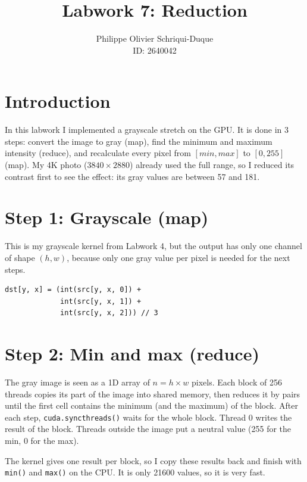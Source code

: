 \documentclass{report}
\begin{document}
\title{Labwork 7: Reduction}
\author{Philippe Olivier Schriqui-Duque \\ ID: 2640042}
\date{}
\maketitle

\section*{Introduction}

In this labwork I implemented a grayscale stretch on the GPU. It is done in 3 steps: convert the image to gray (map), find the minimum and maximum intensity (reduce), and recalculate every pixel from $[min, max]$ to $[0, 255]$ (map). My 4K photo ($3840 \times 2880$) already used the full range, so I reduced its contrast first to see the effect: its gray values are between 57 and 181.

\section*{Step 1: Grayscale (map)}

This is my grayscale kernel from Labwork 4, but the output has only one channel of shape $(h, w)$, because only one gray value per pixel is needed for the next steps.

\begin{verbatim}
dst[y, x] = (int(src[y, x, 0]) +
             int(src[y, x, 1]) +
             int(src[y, x, 2])) // 3
\end{verbatim}

\section*{Step 2: Min and max (reduce)}

The gray image is seen as a 1D array of $n = h \times w$ pixels. Each block of 256 threads copies its part of the image into shared memory, then reduces it by pairs until the first cell contains the minimum (and the maximum) of the block. After each step, \texttt{cuda.syncthreads()} waits for the whole block. Thread 0 writes the result of the block. Threads outside the image put a neutral value (255 for the min, 0 for the max).

The kernel gives one result per block, so I copy these results back and finish with \texttt{min()} and \texttt{max()} on the CPU. It is only 21600 values, so it is very fast.
\end{document}
